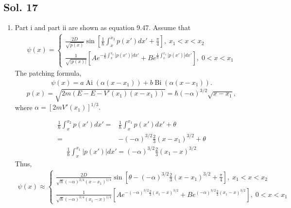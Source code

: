 \subsection*{Sol. 17}
\begin{enumerate}
    \item 
    Part i and part ii are shown as equation 9.47.
    Assume that 
    \begin{align*}
        \psi(x) = 
        \begin{cases}
        \frac{2D}{\sqrt{p(x)}}\sin\left[
        \frac{1}{\hbar}\int_{x}^{x_2}p(x')dx'+\frac{\pi}{4}
        \right],\;x_1<x<x_2
        \\
        \frac{1}{\sqrt{|p(x)|}}[Ae^{-\frac{1}{\hbar}\int_x^{x_1}|p(x')|dx'}+Be^{\frac{1}{\hbar}\int_x^{x_1}|p(x')|dx'}],\; 0<x<x_1
        \end{cases}
    \end{align*}
    The patching formula,
    \begin{align*}
        \psi(x)=a\operatorname{Ai}(\alpha(x-x_1)) + b \operatorname{Bi}(\alpha(x-x_1)).
    \end{align*}
    $$
    p(x)=\sqrt{2m(E-E-V'(x_1)(x-x_1))}=\hbar(-\alpha)^{3/2}\sqrt{x-x_1},
    $$
    where $\alpha=\left[2mV'(x_1)\right]^{1/3}.$

    \begin{align*}
        \frac{1}{\hbar}\int_x^{x_2}p(x')dx'=&
        \frac{1}{\hbar}\int_x^{x_1}p(x')dx'+\theta\\
    =&-(-\alpha)^{3/2}\frac{2}{3}(x-x_1)^{3/2}+\theta
    \end{align*}
    \begin{align*}
        \frac{1}{\hbar}\int_x^{x_1}|p(x')|dx'
    =(-\alpha)^{3/2}\frac{2}{3}(x_1-x)^{3/2}
    \end{align*}
    Thus,
    \begin{align*}
        \psi(x) \approx
        \begin{cases}
        \frac{2D}{\sqrt{\hbar}(-\alpha)^{3/4}(x-x_1)^{1/4}}
        \sin\left[
        \theta-(-\alpha)^{3/2}\frac{2}{3}(x-x_1)^{3/2}+\frac{\pi}{4}
        \right],\;x_1<x<x_2
        \\
        \frac{1}{\sqrt{\hbar}(-\alpha)^{3/4}(x_1-x)^{1/4}}
        [Ae^{-(-\alpha)^{3/2}\frac{2}{3}(x_1-x)^{3/2}}+
        Be^{(-\alpha)^{3/2}\frac{2}{3}(x_1-x)^{3/2}}],\; 0<x<x_1
        \end{cases}
    \end{align*}
    

\end{enumerate}
